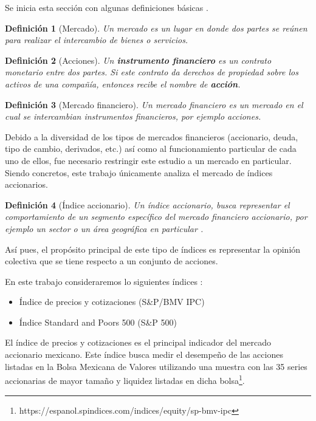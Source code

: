 \documentclass[12pt]{report}
\theoremstyle{break}
\newtheorem{definicion}{Definición}[chapter]
\theoremstyle{break}
\begin{document}
Se inicia esta sección con algunas definiciones básicas \cite{CFA2019-market-org}.

\begin{definicion}[Mercado]
\label{definicion:mercado}
Un mercado es un lugar en donde dos partes se reúnen para realizar el intercambio de bienes o servicios.
\end{definicion}

\begin{definicion}[Acciones]
\label{definicion:instrumento-financiero}
Un \textbf{instrumento financiero} es un contrato monetario entre dos partes. Si este contrato da derechos de propiedad sobre los activos de una compañía, entonces recibe el nombre de \textbf{acción}.
\end{definicion}

\begin{definicion}[Mercado financiero]
\label{definicion:mercado-financiero}
Un mercado financiero es un mercado en el cual se intercambian instrumentos financieros, por ejemplo acciones.
\end{definicion}

Debido a la diversidad de los tipos de mercados financieros (accionario, deuda, tipo de cambio, derivados, etc.) así como al funcionamiento particular de cada uno de ellos, fue necesario restringir este estudio a un mercado en particular. Siendo concretos, este trabajo únicamente analiza el mercado de índices accionarios.

\begin{definicion}[Índice accionario]
\label{definicion:indice-accionario}
Un índice accionario, busca representar el comportamiento de un segmento específico del mercado financiero accionario, por ejemplo un sector o un área geográfica en particular \cite{CFA2019-market-index}.
\end{definicion}

Así pues, el propósito principal de este tipo de índices es representar la opinión colectiva que se tiene respecto a un conjunto de acciones.

En este trabajo consideraremos lo siguientes índices :

\begin{itemize}
\item Índice de precios y cotizaciones (S\&P/BMV IPC)
\item Índice Standard and Poors 500 (S\&P 500)
\end{itemize}

El índice de precios y cotizaciones es el principal indicador del mercado accionario mexicano. Este índice busca medir el desempeño de las acciones listadas en la Bolsa Mexicana de Valores utilizando una muestra con las 35 series accionarias de mayor tamaño y liquidez listadas en dicha bolsa\footnote{https://espanol.spindices.com/indices/equity/sp-bmv-ipc}.
\end{document}
